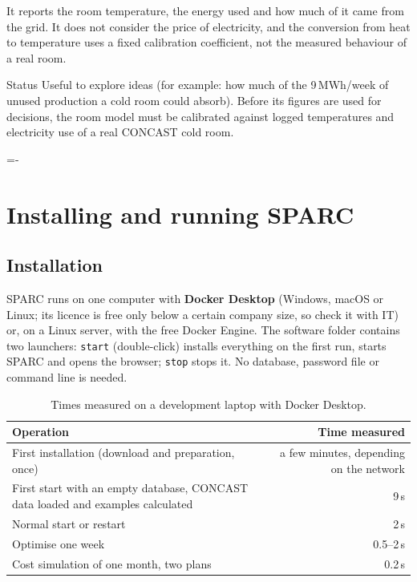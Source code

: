\documentclass[10pt,a4paper]{scrartcl}
\makeatletter
\newcommand{\NeedSpace}[1]{\par\begingroup\dimen@=\pagegoal\advance\dimen@-\pagetotal
    \ifdim\dimen@<#1\relax\newpage\fi\endgroup}
\newcommand{\RuleSection}[1]{%
    \NeedSpace{10\baselineskip}%
    \section{#1}%
    \vspace{0.2em}{\color{accent!35}\hrule height 0.4pt}\vspace{0.3em}%
  }
\makeatother
\begin{document}
  It reports the room temperature, the energy used and how much of it came from the grid. It does
  not consider the price of electricity, and the conversion from heat to temperature uses a fixed
  calibration coefficient, not the measured behaviour of a real room.

  \begin{notebox}{Status}
    Useful to explore ideas (for example: how much of the 9\,MWh/week of unused production a cold
    room could absorb). Before its figures are used for decisions, the room model must be calibrated
    against logged temperatures and electricity use of a real CONCAST cold room.
  \end{notebox}

  \RuleSection{Installing and running SPARC}
  \label{sec:operating}

  \subsection{Installation}

  SPARC runs on one computer with \textbf{Docker Desktop} (Windows, macOS or Linux; its licence is
  free only below a certain company size, so check it with IT) or, on a Linux server, with the free
  Docker Engine. The software folder contains two launchers: \texttt{start} (double-click) installs
  everything on the first run, starts SPARC and opens the browser; \texttt{stop} stops it. No
  database, password file or command line is needed.

  \begin{table}[H]
  \small
  \centering
  \renewcommand{\arraystretch}{1.15}
  \begin{tabularx}{\textwidth}{@{}Y r@{}}
  \toprule
  \textbf{Operation} & \textbf{Time measured} \\
  \midrule
  First installation (download and preparation, once)          & a few minutes, depending on the network \\
  First start with an empty database, CONCAST data loaded and examples calculated & 9\,s \\
  Normal start or restart                                         & 2\,s \\
  Optimise one week                                               & 0.5--2\,s \\
  Cost simulation of one month, two plans                         & 0.2\,s \\
  \bottomrule
  \end{tabularx}
  \caption{Times measured on a development laptop with Docker Desktop.}
  \end{table}
\end{document}
